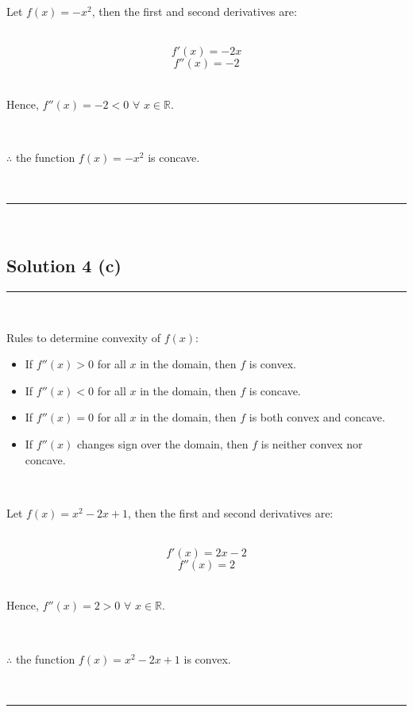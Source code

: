 \documentclass{article}
\begin{document}
\parbox{\textwidth}{
Let $f(x) = -x^2$, then the first and second derivatives are:
}\\

$$f'(x) = -2x$$
$$f''(x) = -2$$\\

\parbox{\textwidth}{
Hence, $f''(x) = -2 < 0$ $\forall$ $x \in \mathbb{R}$.
}\\

\parbox{\textwidth}{
$\therefore$ the function $f(x) = -x^2$ is concave.
}\\

\noindent\rule{\textwidth}{0.4pt}\\

\newpage

\subsection*{Solution 4 (c)}
\noindent\rule{\textwidth}{0.4pt}\\

\parbox{\textwidth}{
Rules to determine convexity of $f(x)$:
\begin{itemize}
    \item If $f''(x) > 0$ for all $x$ in the domain, then $f$ is convex.
    \item If $f''(x) < 0$ for all $x$ in the domain, then $f$ is concave.
    \item If $f''(x) = 0$ for all $x$ in the domain, then $f$ is both convex and concave.
    \item If $f''(x)$ changes sign over the domain, then $f$ is neither convex nor concave.
\end{itemize}
}\\

\parbox{\textwidth}{
Let $f(x) = x^2 - 2x + 1$, then the first and second derivatives are:
}\\

$$f'(x) = 2x - 2$$
$$f''(x) = 2$$\\

\parbox{\textwidth}{
Hence, $f''(x) = 2 > 0$ $\forall$ $x \in \mathbb{R}$.
}\\

\parbox{\textwidth}{
$\therefore$ the function $f(x) = x^2 - 2x + 1$ is convex.
}\\

\noindent\rule{\textwidth}{0.4pt}\\

\newpage
\end{document}
